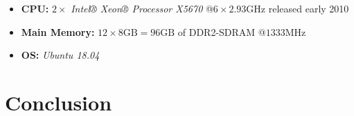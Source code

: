 \begin{@empty}
    \begin{itemize}
        \itemsep0em
        \item \textbf{CPU:} $2 \times $ \emph{Intel® Xeon® Processor X5670} @$6 \times 2.93\text{GHz}$ released early 2010
        \item \textbf{Main Memory:} $12 \times 8\text{GB} = 96\text{GB}$ of DDR2-SDRAM @$1333\text{MHz}$
        \item \textbf{OS:} \emph{Ubuntu 18.04}
    \end{itemize}
\end{@empty}

\section{Conclusion}
